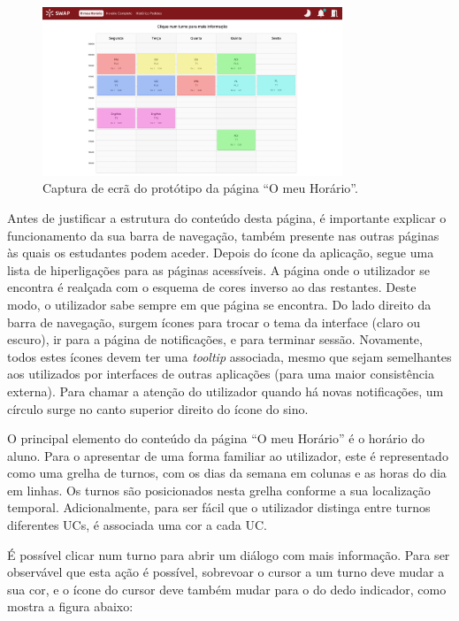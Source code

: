 \documentclass[12pt, a4paper]{article}
\begin{document}
\begin{figure}[H]
    \centering
    \includegraphics[width=0.8\textwidth]{res/prototype/o-meu-horario.png}
    \caption{Captura de ecrã do protótipo da página ``O meu Horário''.}
    \label{o-meu-horario}
\end{figure}

Antes de justificar a estrutura do conteúdo desta página, é importante explicar o funcionamento da
sua barra de navegação, também presente nas outras páginas às quais os estudantes podem aceder.
Depois do ícone da aplicação, segue uma lista de hiperligações para as páginas acessíveis. A página
onde o utilizador se encontra é realçada com o esquema de cores inverso ao das restantes. Deste
modo, o utilizador sabe sempre em que página se encontra. Do lado direito da barra de navegação,
surgem ícones para trocar o tema da interface (claro ou escuro), ir para a página de notificações, e
para terminar sessão. Novamente, todos estes ícones devem ter uma \emph{tooltip} associada, mesmo
que sejam semelhantes aos utilizados por interfaces de outras aplicações (para uma maior
consistência externa). Para chamar a atenção do utilizador quando há novas notificações, um círculo
surge no canto superior direito do ícone do sino.

O principal elemento do conteúdo da página ``O meu Horário'' é o horário do aluno. Para o apresentar
de uma forma familiar ao utilizador, este é representado como uma grelha de turnos, com os dias da
semana em colunas e as horas do dia em linhas. Os turnos são posicionados nesta grelha conforme a
sua localização temporal. Adicionalmente, para ser fácil que o utilizador distinga entre turnos
diferentes UCs, é associada uma cor a cada UC.

É possível clicar num turno para abrir um diálogo com mais informação. Para ser observável que esta
ação é possível, sobrevoar o cursor a um turno deve mudar a sua cor, e o ícone do cursor deve também
mudar para o do dedo indicador, como mostra a figura abaixo:
\end{document}
